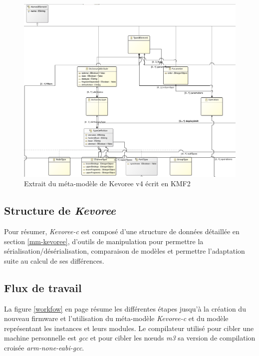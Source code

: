 \begin{figure}[ht!]
\centering
\includegraphics[scale=0.4]{images/kevoree-cd.png}
\caption{Extrait du méta-modèle de Kevoree v4 écrit en KMF2}
\label{kevoree-cd}
\end{figure}

\subsection{Structure de \emph{Kevoree}}

Pour résumer, \emph{Kevoree-c} est composé d'une structure de données détaillée en section \ref{mm-kevoree}, d'outils de manipulation pour permettre la sérialisation/désérialisation, comparaison de modèles et permettre l'adaptation suite au calcul de ses différences.

\subsection{Flux de travail}

La figure \ref{workfow} en page \pageref{workfow} résume les différentes étapes jusqu'à la création du nouveau firmware et l'utilisation du méta-modèle \emph{Kevoree-c} et du modèle représentant les instances et leurs modules. Le compilateur utilisé pour cibler une machine personnelle est \emph{gcc} et pour cibler les nœuds \emph{m3} sa version de compilation croisée \emph{arm-none-eabi-gcc}.

